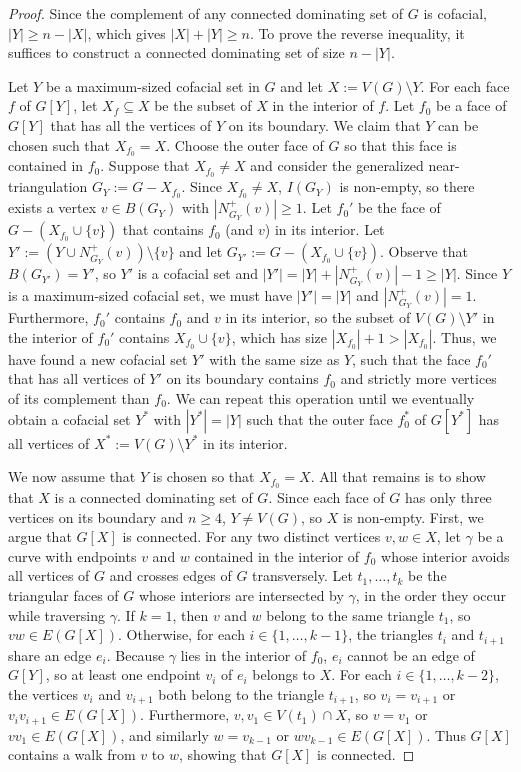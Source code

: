 \documentclass{patmorin}
\begin{document}
\begin{proof}
  Since the complement of any connected dominating set of $G$ is cofacial, $|Y| \ge n - |X|$, which gives $|X| + |Y| \ge n$. To prove the reverse inequality, it suffices to construct a connected dominating set of size $n - |Y|$.

  Let $Y$ be a maximum-sized cofacial set in $G$ and let $X:=V(G)\setminus Y$.  For each face $f$ of $G[Y]$, let $X_f\subseteq X$ be the subset of $X$ in the interior of $f$.  Let $f_0$ be a face of $G[Y]$ that has all the vertices of $Y$ on its boundary. We claim that $Y$ can be chosen such that $X_{f_0}=X$. Choose the outer face of $G$ so that this face is contained in $f_0$.  Suppose that $X_{f_0}\neq X$ and consider the generalized near-triangulation $G_Y:=G-X_{f_0}$.  Since $X_{f_0}\neq X$, $I(G_Y)$ is non-empty, so there exists a vertex $v\in B(G_Y)$ with $|N^+_{G_Y}(v)|\ge 1$. Let $f_0'$ be the face of $G-(X_{f_0}\cup\{v\})$ that contains $f_0$ (and $v$) in its interior.  Let $Y':=(Y\cup N^+_{G_Y}(v))\setminus \{v\}$ and let $G_{Y'}:=G-(X_{f_0}\cup\{v\})$.  Observe that $B(G_{Y'})=Y'$, so $Y'$ is a cofacial set and $|Y'| = |Y| + |N^+_{G_Y}(v)| - 1\ge |Y|$.  Since $Y$ is a maximum-sized cofacial set, we must have $|Y'|=|Y|$ and $|N^+_{G_Y}(v)|=1$.  Furthermore, $f_0'$ contains $f_0$ and $v$ in its interior, so the subset of $V(G)\setminus Y'$ in the interior of $f_0'$ contains $X_{f_0}\cup\{v\}$, which has size $|X_{f_0}|+1>|X_{f_0}|$. Thus, we have found a new cofacial set $Y'$ with the same size as $Y$, such that the face $f_0'$ that has all vertices of $Y'$ on its boundary contains $f_0$ and strictly more vertices of its complement than $f_0$. We can repeat this operation until we eventually obtain a cofacial set $Y^*$ with $|Y^*|=|Y|$ such that the outer face $f_0^*$ of $G[Y^*]$ has all vertices of $X^*:=V(G)\setminus Y^*$ in its interior.

  We now assume that $Y$ is chosen so that $X_{f_0}=X$.  All that remains is to show that $X$ is a connected dominating set of $G$.  Since each face of $G$ has only three vertices on its boundary and $n\ge 4$, $Y\neq V(G)$, so $X$ is non-empty.  First, we argue that $G[X]$ is connected. For any two distinct vertices $v,w\in X$, let $\gamma$ be a curve with endpoints $v$ and $w$ contained in the interior of $f_0$ whose interior avoids all vertices of $G$ and crosses edges of $G$ transversely. Let $t_1,\ldots,t_k$ be the triangular faces of $G$ whose interiors are intersected by $\gamma$, in the order they occur while traversing $\gamma$. If $k=1$, then $v$ and $w$ belong to the same triangle $t_1$, so $vw\in E(G[X])$. Otherwise, for each $i\in\{1,\ldots,k-1\}$, the triangles $t_i$ and $t_{i+1}$ share an edge $e_i$. Because $\gamma$ lies in the interior of $f_0$, $e_i$ cannot be an edge of $G[Y]$, so at least one endpoint $v_i$ of $e_i$ belongs to $X$. For each $i\in\{1,\ldots,k-2\}$, the vertices $v_i$ and $v_{i+1}$ both belong to the triangle $t_{i+1}$, so $v_i=v_{i+1}$ or $v_i v_{i+1}\in E(G[X])$. Furthermore, $v, v_1 \in V(t_1) \cap X$, so $v=v_1$ or $vv_1\in E(G[X])$, and similarly $w=v_{k-1}$ or $wv_{k-1}\in E(G[X])$. Thus $G[X]$ contains a walk from $v$ to $w$, showing that $G[X]$ is connected.


\end{proof}
\end{document}
